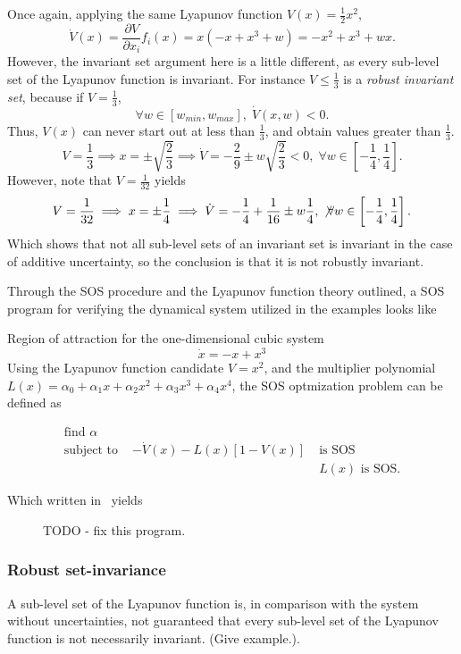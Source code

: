 Once again, applying the same Lyapunov function \(V(x) = \frac{1}{2}x^2\),
\[
  \dot{V}(x) = \frac{\partial V}{\partial x_i} f_i(x) = x(-x + x^3 + w) = -x^2 +
  x^3 + wx.
\]
However, the invariant set argument here is a little different, as every
sub-level set of the Lyapunov function is invariant. For instance \(V \leq
\frac{1}{3}\) is a \textit{robust invariant set}, because if \(V =
\frac{1}{3}\),
\[
  \forall w \in \left[ w_{min}, w_{max} \right], \; \dot{V}(x,w) < 0.
\]
Thus, \(V(x)\) can never start out at less than \(\frac{1}{3}\), and obtain
values greater than \(\frac{1}{3}\).
\[
  V = \frac{1}{3} \implies x = \pm \sqrt{\frac{2}{3}} \implies \dot{V} =
  -\frac{2}{9} \pm w \sqrt{\frac{2}{3}} < 0, \; \forall w \in \left[
    -\frac{1}{4}, \frac{1}{4} \right].
\]
However, note that \(V = \frac{1}{32}\) yields
\[
  V = \frac{1}{32} \implies x = \pm \frac{1}{4} \implies \dot{V} = -\frac{1}{4}
  + \frac{1}{16} \pm w\frac{1}{4}, \; \not \forall w \in \left[ -\frac{1}{4},
    \frac{1}{4} \right].
\]
Which shows that not all sub-level sets of an invariant set is invariant in the
case of additive uncertainty, so the conclusion is that it is not robustly
invariant.

Through the \ac{SOS} procedure and the Lyapunov function theory outlined, a
\ac{SOS} program for verifying the dynamical system utilized in the examples
looks like
\begin{example}{Region of attraction for the one-dimensional cubic system}
  \[
    \dot{x} = -x + x^3
  \]
  Using the Lyapunov function candidate \(V = x^2\), and the multiplier
  polynomial \(L(x) = \alpha_0 + \alpha_1x + \alpha_2x^2 + \alpha_3x^3 +
  \alpha_4x^4\), the \ac{SOS} optmization problem can be defined as

\begin{align*}
  \text{find } \alpha& \\
  \text{subject to }& -\dot{V}(x) - L(x)\left[ 1 - V(x) \right] \; &\text{is SOS} \\
                     & &L(x) \text{ is SOS}.
\end{align*}

Which written in~\cite[Yalmip]{Lofberg2004,Lofberg2009} yields

\end{example}

\begin{figure}
  \centering
  
  \caption{TODO - fix this program.}
\end{figure}

\subsubsection{Robust set-invariance}

A sub-level set of the Lyapunov function is, in comparison with the system
without uncertainties, not guaranteed that every sub-level set of the Lyapunov
function is not necessarily invariant. (Give example.).

